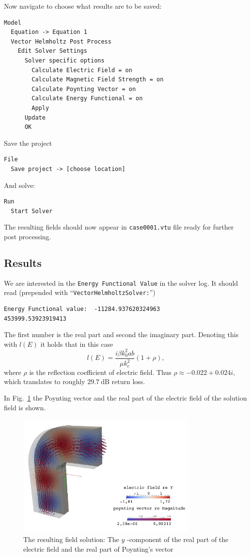 Now navigate to choose what results are to be saved:
\begin{verbatim}
Model
  Equation -> Equation 1
  Vector Helmholtz Post Process
    Edit Solver Settings
      Solver specific options
        Calculate Electric Field = on
        Calculate Magnetic Field Strength = on
        Calculate Poynting Vector = on
        Calculate Energy Functional = on
        Apply
      Update
      OK
\end{verbatim}

Save the project
\begin{verbatim}
File
  Save project -> [choose location]
\end{verbatim}

And solve:
\begin{verbatim}
Run
  Start Solver
\end{verbatim}

The resulting fields should now appear in \texttt{case0001.vtu} file ready for
further post processing.

\subsection*{Results}
We are interested in the \texttt{Energy Functional Value} in the solver
log. It should read (prepended with ``\texttt{VectorHelmholtzSolver:}'')

\small{
\begin{verbatim}
Energy Functional value:  -11284.937620324963        453999.53923919413
\end{verbatim}
}

The first number is the real part and second the imaginary part.
Denoting this with $l(E)$ it holds that in this case
\[l(E) = \frac {i \beta k_0^2
ab}{\mu k_c^2} (1+\rho),\] where $\rho$ is the reflection coefficient of
electric field. Thus $\rho\approx-0.022+0.024i$, which translates to roughly $29.7~\mathrm{dB}$ return loss.

In Fig.~\ref{fig:solution} the Poynting vector and the real part of the
electric field of the solution field is shown.

\begin{figure}[htbp]
\centering
\includegraphics[width=0.8\textwidth]{result.pdf}
\caption{The resulting field solution: The $y$ -component of the real part
of the electric field and the real part of Poynting's vector}
\label{fig:solution}
\end{figure}
